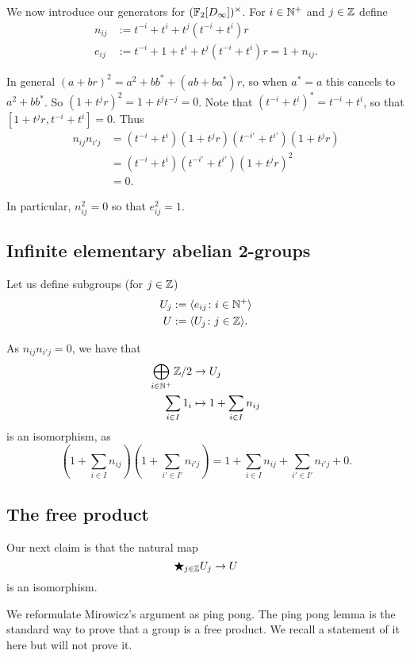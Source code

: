 We now introduce our generators for $(\mathbb{F}_2[D_\infty])^\times$.
For $i \in \mathbb{N}^+$ and $j \in \mathbb{Z}$ define
\begin{align*}
    n_{ij} &:= t^{-i} + t^i + t^j (t^{-i} + t^i) r \\
    e_{ij} &:= t^{-i} + 1 + t^i + t^j (t^{-i} + t^i) r = 1 + n_{ij}.
\end{align*}

In general $(a + br)^2 = a^2 + bb^* + (ab + ba^*)r$, so when $a^* = a$ this cancels to $a^2 + bb^*$.
So $(1 + t^j r)^2 = 1 + t^j t^{-j} = 0$.
Note that $(t^{-i} + t^i)^* = t^{-i} + t^i$, so that $[1 + t^j r, t^{-i} + t^i] = 0$.
Thus
\begin{align*}
    n_{ij} n_{i'j}
    &= (t^{-i} + t^i) (1 + t^j r) (t^{-i'} + t^{i'}) (1 + t^j r) \\
    &= (t^{-i} + t^i) (t^{-i'} + t^{i'}) (1 + t^j r)^2 \\
    &= 0.
\end{align*}

In particular, $n_{ij}^2 = 0$ so that $e_{ij}^2 = 1$.

\subsection*{Infinite elementary abelian 2-groups}

Let us define subgroups (for $j \in \mathbb{Z}$)
\begin{align*}
    U_j &:= \langle  e_{ij} \colon i \in \mathbb{N}^+ \rangle \\
    U &:= \langle U_j \colon j \in \mathbb{Z} \rangle.
\end{align*}

As $n_{ij} n_{i'j} = 0$, we have that
\begin{align*}
    \bigoplus_{i \in \mathbb{N}^+} \mathbb{Z}/2 &\to U_j \\
    \sum_{i \in I} 1_i &\mapsto 1 + \sum_{i \in I} n_{ij}
\end{align*}
is an isomorphism, as \[
    (1 + \sum_{i \in I} n_{ij}) (1 + \sum_{i' \in I'}n_{i'j}) = 1 + \sum_{i \in I} n_{ij} + \sum_{i' \in I'}n_{i'j} + 0.
\]

\subsection*{The free product}

Our next claim is that the natural map \[
    \bigstar_{j \in \mathbb{Z}} U_j \to U
\] is an isomorphism.

We reformulate Mirowicz's argument as ping pong.
The ping pong lemma is the standard way to prove that a group is a free product.
We recall a statement of it here but will not prove it.

